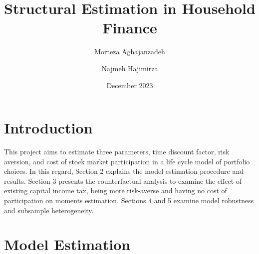 \documentclass[13pt]{article}
\title{Structural Estimation in Household Finance}
\author{Morteza Aghajanzadeh \and Najmeh Hajimirza}
\date{December 2023}
\begin{document}
\maketitle

\section{Introduction}
This project aims to estimate three parameters, time discount factor, risk aversion, and cost of stock market participation in a life cycle model of portfolio choices. In this regard, Section 2 explains the model estimation procedure and results. Section 3 presents the counterfactual analysis to examine the effect of existing capital income tax, being more risk-averse and having no cost of participation on moments estimation. Sections 4 and 5 examine model robustness and subsample heterogeneity.

\section{Model Estimation}
\end{document}
